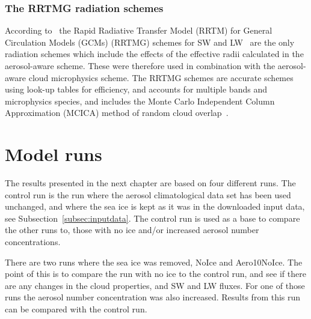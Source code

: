 \subsubsection{The RRTMG radiation schemes}
According to~\citet{Thompson2014} the Rapid Radiative Transfer Model (RRTM) for General Circulation Models (GCMs) (RRTMG) schemes for SW and LW~\citep{Mlawer1997, Iacono2000, Iacono2003, Iacono2008} are the only radiation schemes which include the effects of the effective radii calculated in the aerosol-aware scheme. These were therefore used in combination with the aerosol-aware cloud microphysics scheme. The RRTMG schemes are accurate schemes using look-up tables for efficiency, and accounts for multiple bands and microphysics species, and includes the Monte Carlo Independent Column Approximation (MCICA) method of random cloud overlap~\citep{Wang2015}.

\section{Model runs}
The results presented in the next chapter are based on four different runs. The control run is the run where the aerosol climatological data set has been used unchanged, and where the sea ice is kept as it was in the downloaded input data, see Subsection~\ref{subsec:inputdata}. The control run is used as a base to compare the other runs to, those with no ice and/or increased aerosol number concentrations.

There are two runs where the sea ice was removed, NoIce and Aero10NoIce. The point of this is to compare the run with no ice to the control run, and see if there are any changes in the cloud properties, and SW and LW fluxes. For one of those runs the aerosol number concentration was also increased. Results from this run can be compared with the control run.

